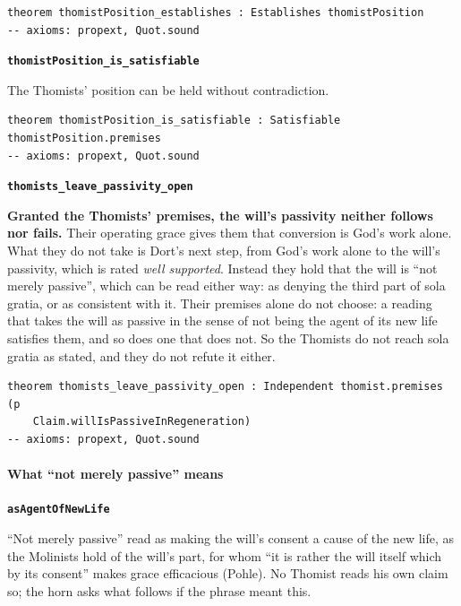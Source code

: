 \documentclass[11pt]{article}
\begin{document}
{\small\begin{verbatim}
theorem thomistPosition_establishes : Establishes thomistPosition
-- axioms: propext, Quot.sound
\end{verbatim}}
\par\medskip\noindent\textbf{\texttt{thomist\allowbreak{}Position\_\allowbreak{}is\_\allowbreak{}satisfiable}}\par\nobreak\noindent
The Thomists’ position can be held without contradiction.

{\small\begin{verbatim}
theorem thomistPosition_is_satisfiable : Satisfiable thomistPosition.premises
-- axioms: propext, Quot.sound
\end{verbatim}}
\par\medskip\noindent\textbf{\texttt{thomists\_\allowbreak{}leave\_\allowbreak{}passivity\_\allowbreak{}open}}\par\nobreak\noindent
\textbf{Granted the Thomists’ premises, the will’s passivity neither follows nor fails.} Their operating grace gives them that conversion is God’s work alone. What they do not take is Dort’s next step, from God’s work alone to the will’s passivity, which is rated \emph{well supported}. Instead they hold that the will is “not merely passive”, which can be read either way: as denying the third part of sola gratia, or as consistent with it. Their premises alone do not choose: a reading that takes the will as passive in the sense of not being the agent of its new life satisfies them, and so does one that does not. So the Thomists do not reach sola gratia as stated, and they do not refute it either.

{\small\begin{verbatim}
theorem thomists_leave_passivity_open : Independent thomist.premises (p
    Claim.willIsPassiveInRegeneration)
-- axioms: propext, Quot.sound
\end{verbatim}}
\paragraph*{What “not merely passive” means}
\leavevmode\par\nobreak
\par\medskip\noindent\textbf{\texttt{as\allowbreak{}Agent\allowbreak{}Of\allowbreak{}New\allowbreak{}Life}}\par\nobreak\noindent
“Not merely passive” read as making the will’s consent a cause of the new life, as the Molinists hold of the will’s part, for whom “it is rather the will itself which by its consent” makes grace efficacious (Pohle). No Thomist reads his own claim so; the horn asks what follows if the phrase meant this.
\end{document}
